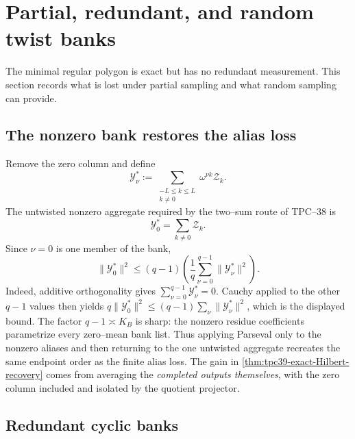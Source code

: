 \section{Partial, redundant, and random twist banks}
\label{sec:tpc39-partial-random}

The minimal regular polygon is exact but has no redundant measurement.
This section records what is lost under partial sampling and what random
sampling can provide.

\subsection{The nonzero bank restores the alias loss}

Remove the zero column and define
\begin{equation}
 \mathscr Y_\nu^*
 :=\sum_{\substack{-L\le k\le L\\k\ne0}}
 \omega^{\nu k}\mathscr Z_k.
 \label{eq:tpc39-nonzero-twisted-bank}
\end{equation}
The untwisted nonzero aggregate required by the two--sum route of TPC--38
is
\begin{equation}
 \mathscr Y_0^*
 =\sum_{k\ne0}\mathscr Z_k.
 \label{eq:tpc39-nonzero-untwisted-sum}
\end{equation}
Since \(\nu=0\) is one member of the bank,
\begin{equation}
 \boxed{
 \|\mathscr Y_0^*\|^2
 \le (q-1)\left(
 \frac1q\sum_{\nu=0}^{q-1}\|\mathscr Y_\nu^*\|^2
 \right).}
 \label{eq:tpc39-nonzero-bank-qminusone-loss}
\end{equation}
Indeed, additive orthogonality gives
\(\sum_{\nu=0}^{q-1}\mathscr Y_\nu^*=0\).  Cauchy applied to the other
\(q-1\) values then yields
\(q\|\mathscr Y_0^*\|^2\le(q-1)\sum_\nu\|\mathscr Y_\nu^*\|^2\),
which is the displayed bound.  The factor \(q-1\asymp K_B\) is sharp:
the nonzero residue coefficients parametrize every zero--mean bank list.
Thus applying Parseval only to the nonzero aliases and then returning to
the one untwisted aggregate recreates the same endpoint order as the finite
alias loss.  The gain in \cref{thm:tpc39-exact-Hilbert-recovery} comes
from averaging the \emph{completed outputs themselves}, with the zero
column included and isolated by the quotient projector.

\subsection{Redundant cyclic banks}

